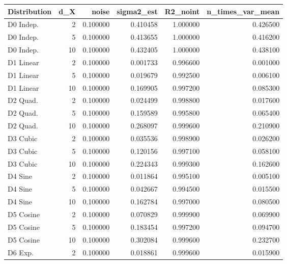 
\begin{tabular}{lrrrrr}
\toprule
Distribution &  d\_X &    noise &  sigma2\_est &  R2\_noint &  n\_times\_var\_mean \\
\midrule
   D0 Indep. &    2 & 0.100000 &    0.410458 &  1.000000 &          0.426500 \\
   D0 Indep. &    5 & 0.100000 &    0.413655 &  1.000000 &          0.416200 \\
   D0 Indep. &   10 & 0.100000 &    0.432405 &  1.000000 &          0.438100 \\
   D1 Linear &    2 & 0.100000 &    0.001733 &  0.996600 &          0.001000 \\
   D1 Linear &    5 & 0.100000 &    0.019679 &  0.992500 &          0.006100 \\
   D1 Linear &   10 & 0.100000 &    0.169905 &  0.997200 &          0.085300 \\
    D2 Quad. &    2 & 0.100000 &    0.024499 &  0.998800 &          0.017600 \\
    D2 Quad. &    5 & 0.100000 &    0.159589 &  0.995800 &          0.065400 \\
    D2 Quad. &   10 & 0.100000 &    0.268097 &  0.999600 &          0.210900 \\
    D3 Cubic &    2 & 0.100000 &    0.035536 &  0.998900 &          0.026200 \\
    D3 Cubic &    5 & 0.100000 &    0.120156 &  0.997100 &          0.058100 \\
    D3 Cubic &   10 & 0.100000 &    0.224343 &  0.999300 &          0.162600 \\
     D4 Sine &    2 & 0.100000 &    0.011864 &  0.995100 &          0.005100 \\
     D4 Sine &    5 & 0.100000 &    0.042667 &  0.994500 &          0.015500 \\
     D4 Sine &   10 & 0.100000 &    0.162784 &  0.997000 &          0.080500 \\
   D5 Cosine &    2 & 0.100000 &    0.070829 &  0.999900 &          0.069900 \\
   D5 Cosine &    5 & 0.100000 &    0.183454 &  0.997200 &          0.094700 \\
   D5 Cosine &   10 & 0.100000 &    0.302084 &  0.999600 &          0.232700 \\
     D6 Exp. &    2 & 0.100000 &    0.018861 &  0.999600 &          0.015900 \\

\end{tabular}
